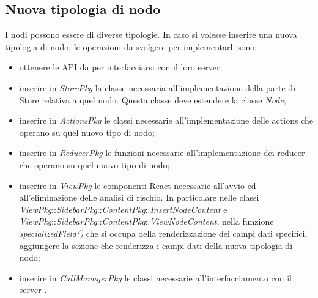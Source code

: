 \subsection{Nuova tipologia di nodo}
I nodi possono essere di diverse tipologie. In caso si volesse inserire una nuova tipologia di nodo, le operazioni da svolgere per implementarli sono:
\begin{itemize}
	\item ottenere le API da \riskapp{} per interfacciarsi con il loro server;
	\item inserire in \textit{StorePkg} la classe necessaria all'implementazione della parte di Store relativa a quel nodo. Questa classe deve estendere la classe \textit{Node};
	\item inserire in \textit{ActionsPkg} le classi necessarie all'implementazione delle actions che operano su quel nuovo tipo di nodo;
	\item inserire in \textit{ReducerPkg} le funzioni necessarie all'implementazione dei reducer che operano su quel nuovo tipo di nodo;
	\item inserire in \textit{ViewPkg} le componenti React necessarie all'avvio ed all'eliminazione delle analisi di rischio. In particolare nelle classi \textit{ViewPkg}::\textit{SidebarPkg}::\textit{ContentPkg}::\textit{InsertNodeContent} e \textit{ViewPkg}::\textit{SidebarPkg}::\textit{ContentPkg}::\textit{ViewNodeContent}, nella funzione \textit{specializedField()} che si occupa della renderizzazione dei campi dati specifici, aggiungere la sezione che renderizza i campi dati della nuova tipologia di nodo;
	\item inserire in \textit{CallManagerPkg} le classi necessarie all'interfacciamento con il server \riskapp{}.
\end{itemize}


